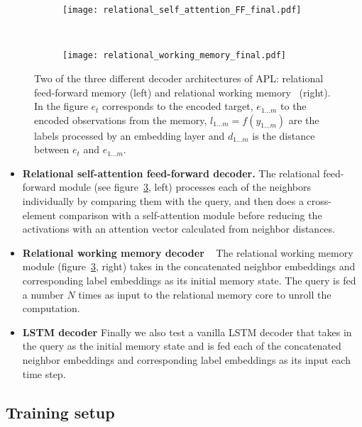 \documentclass{article} \usepackage{iclr2019_conference,times}
\begin{document}
\begin{figure}
    \centering
    \begin{subfigure}[b]{0.55\textwidth}
        \texttt{[image: relational\_self\_attention\_FF\_final.pdf]}
        \label{fig:rm}
    \end{subfigure}
    ~ \begin{subfigure}[b]{0.40\textwidth}
        \texttt{[image: relational\_working\_memory\_final.pdf]}
        \label{fig:rwm}
    \end{subfigure}
    \caption{Two of the three different decoder architectures of APL: relational feed-forward memory (left) and relational working memory~\citep{santoro2018relational} (right). In the figure $e_t$ corresponds to the encoded target, $e_{1...m}$ to the encoded observations from the memory, $l_{1...m} = f(y_{1...m})$ are the labels processed by an embedding layer and $d_{1...m}$ is the distance between $e_{t}$ and $e_{1...m}$.}
    \label{fig:decoders}
\end{figure}

\begin{itemize}
    \item \textbf{Relational self-attention feed-forward decoder.}
    The relational feed-forward module (see figure~\ref{fig:decoders}, left) processes each of the neighbors individually by comparing them with the query, and then does a cross-element comparison with a self-attention module before reducing the activations with an attention vector calculated from neighbor distances.
    
    \item \textbf{Relational working memory decoder}
~\citep{santoro2018relational} The relational working memory module (figure~\ref{fig:decoders}, right) takes in the concatenated neighbor embeddings and corresponding label embeddings as its initial memory state. The query is fed a number $N$ times as input to the relational memory core to unroll the computation.

\item \textbf{LSTM decoder}
Finally we also test a vanilla LSTM decoder that takes in the query as the initial memory state and is fed each of the concatenated neighbor embeddings and corresponding label embeddings  as its input each time step.


\end{itemize}



\subsection{Training setup}
\end{document}
